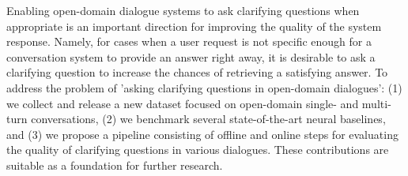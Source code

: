 Enabling open-domain dialogue systems to ask clarifying questions when appropriate is an important direction for improving the quality of the system response. Namely, for cases when a user request is not specific enough for a conversation system to provide an answer right away, it is desirable to ask a clarifying question to increase the chances of retrieving a satisfying answer. To address the problem of 'asking clarifying questions in open-domain dialogues': (1) we collect and release a new dataset focused on open-domain single- and multi-turn conversations, (2) we benchmark several state-of-the-art neural baselines, and (3) we propose a pipeline consisting of offline and online steps for evaluating the quality of clarifying questions in various dialogues. These contributions are suitable as a foundation for further research.
